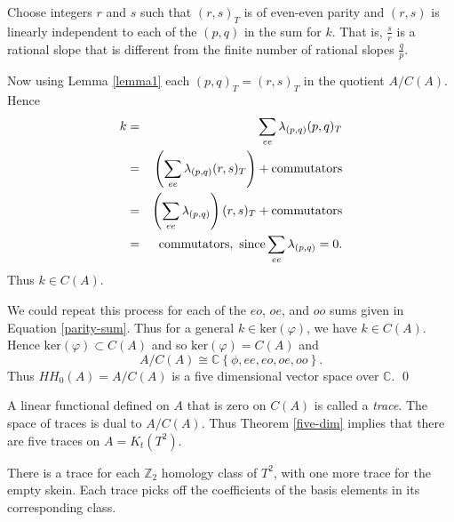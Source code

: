 \documentclass{slides}
\begin{document}
\begin{slide}
Choose integers
$r$ and $s$ such that $(r,s)_T$ is of even-even parity and
$(r,s)$ is linearly independent to each of the $(p,q)$ in
the sum for $k$.
That is, $\frac{s}{r}$ is a rational slope
that is different from the finite number of rational slopes
$\frac{q}{p}$.

Now using Lemma \ref{lemma1} each $(p,q)_T = (r,s)_T$ in
the quotient $A/C(A)$.
Hence
\begin{eqnarray}
k & = & \sum_{ee} \lambda_{(p,q)} (p,q)_T \nonumber \\
& = & \left( \sum_{ee} \lambda_{(p,q)} (r,s)_T \right) + {\rm commutators}
\nonumber \\
& = & \left( \sum_{ee} \lambda_{(p,q)} \right) (r,s)_T + {\rm commutators}
\nonumber \\
& = & {\rm commutators,~since} \sum_{ee} \lambda_{(p,q)} = 0. \nonumber
\end{eqnarray}
Thus $k \in C(A)$.
\end{slide}

\begin{slide}

We could repeat this process for each of the $eo$, $oe$, and $oo$
sums given in Equation \ref{parity-sum}.  Thus for a general
$k \in \mathrm{ker}(\varphi)$, we have $k \in C(A)$.
Hence $\mathrm{ker}(\varphi) \subset C(A)$ and so
$\mathrm{ker}(\varphi) = C(A)$ and
\[
A/C(A) \cong \mathbb{C} \left\{ \phi, ee, eo, oe, oo \right\}.
\]
Thus $HH_0 (A) = A/C(A)$ is a
five dimensional vector space over $\mathbb{C}$.
\qed

A linear functional defined on $A$ that is zero on $C(A)$ is
called a \textit{trace}.  The space of traces is dual to $A / C(A)$.
Thus Theorem \ref{five-dim} implies that there are five traces
on $A = K_t(T^2)$.

There is a trace for each $\mathbb{Z}_2$ homology class of
$T^2$, with one more trace for the empty skein.  Each trace picks off
the coefficients of the basis elements in its corresponding
class.
\end{slide}
\end{document}
